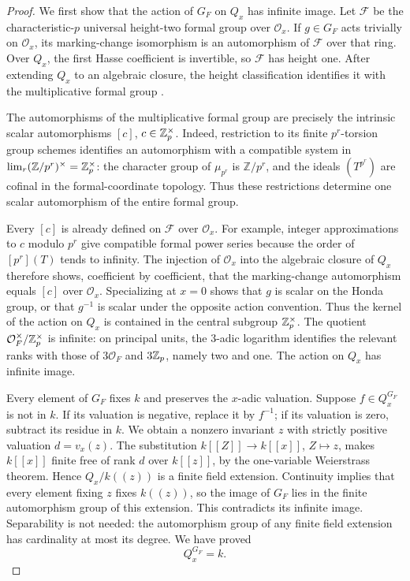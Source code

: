 \begin{proof}
We first show that the action of \(G_F\) on \(Q_x\) has infinite image.
Let \(\mathcal F\) be the characteristic-\(p\) universal height-two formal
group over \(\mathcal O_x\). If \(g\in G_F\) acts trivially on
\(\mathcal O_x\), its marking-change isomorphism is an automorphism of
\(\mathcal F\) over that ring. Over \(Q_x\), the first Hasse coefficient is
invertible, so \(\mathcal F\) has height one. After extending \(Q_x\) to an
algebraic closure, the height classification identifies it with the
multiplicative formal group \citep[Theorem~IV]{Lazard55}.

The automorphisms of the multiplicative formal group are precisely the
intrinsic scalar automorphisms \([c]\), \(c\in\mathbb Z_p^\times\). Indeed,
restriction to its finite \(p^r\)-torsion group schemes identifies an
automorphism with a compatible system in
\(\lim_r(\mathbb Z/p^r)^\times=\mathbb Z_p^\times\): the character group of
\(\mu_{p^r}\) is \(\mathbb Z/p^r\), and the ideals \((T^{p^r})\) are cofinal
in the formal-coordinate topology. Thus these restrictions determine one
scalar automorphism of the entire formal group.

Every \([c]\) is already defined on \(\mathcal F\) over \(\mathcal O_x\).
For example, integer approximations to \(c\) modulo \(p^r\) give compatible
formal power series because the order of \([p^r](T)\) tends to infinity.
The injection of \(\mathcal O_x\) into the algebraic closure of \(Q_x\)
therefore shows, coefficient by coefficient, that the marking-change
automorphism equals \([c]\) over \(\mathcal O_x\). Specializing at \(x=0\)
shows that \(g\) is scalar on the Honda group, or that \(g^{-1}\) is scalar
under the opposite action convention. Thus the kernel of the action on
\(Q_x\) is contained in the central subgroup \(\mathbb Z_p^\times\).
The quotient \(\mathcal O_F^\times/\mathbb Z_p^\times\) is infinite: on principal
units, the \(3\)-adic logarithm identifies the relevant ranks with those
of \(3\mathcal O_F\) and \(3\mathbb Z_p\), namely two and one. The action on \(Q_x\)
has infinite image.

Every element of \(G_F\) fixes \(k\) and preserves the \(x\)-adic valuation.
Suppose \(f\in Q_x^{G_F}\) is not in \(k\). If its valuation is negative,
replace it by \(f^{-1}\); if its valuation is zero, subtract its residue in
\(k\). We obtain a nonzero invariant \(z\) with strictly positive valuation
\(d=v_x(z)\). The substitution \(k[[Z]]\to k[[x]]\), \(Z\mapsto z\), makes
\(k[[x]]\) finite free of rank \(d\) over \(k[[z]]\), by the one-variable
Weierstrass theorem. Hence \(Q_x/k((z))\) is a finite field extension.
Continuity implies that every element fixing \(z\) fixes \(k((z))\), so the
image of \(G_F\) lies in the finite automorphism group of this extension.
This contradicts its infinite image. Separability is not needed: the
automorphism group of any finite field extension has cardinality at most
its degree. We have proved
\begin{equation}\label{eq:generic-fixed-field}
                             Q_x^{G_F}=k.
\end{equation}


\end{proof}
